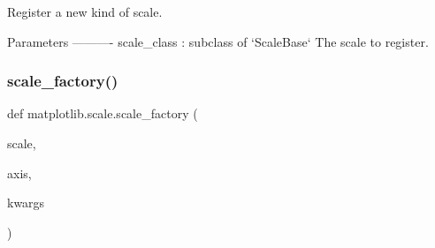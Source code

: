 \begin{DoxyVerb}Register a new kind of scale.

Parameters
----------
scale_class : subclass of `ScaleBase`
    The scale to register.
\end{DoxyVerb}
 \mbox{\label{namespacematplotlib_1_1scale_a0d68d41a05f9a8f65cc3b073460ba814}} 
\subsubsection{\texorpdfstring{scale\+\_\+factory()}{scale\_factory()}}
{\footnotesize\ttfamily def matplotlib.\+scale.\+scale\+\_\+factory (\begin{DoxyParamCaption}\item[{}]{scale,  }\item[{}]{axis,  }\item[{}]{kwargs }\end{DoxyParamCaption})}

 